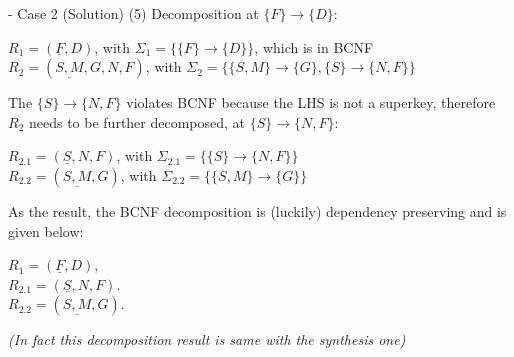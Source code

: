 \begin{frame}[fragile]{ - Case 2 (Solution)}
	(5) Decomposition at $\{F\} \rightarrow \{D\}$:\\\vspace{5pt}
	
	$R_1 = (\underline{F}, D)$, with $\Sigma_1 =\{\{F\} \rightarrow \{D\}\}$, which is in BCNF\\
	$R_2 = (\underline{S,M}, G, N, F)$, with $\Sigma_2 =\{\{S,M\} \rightarrow \{G\}, \{S\} \rightarrow \{N,F\}\}$\\\vspace{5pt}
	
	The $\{S\} \rightarrow \{N,F\}$ violates BCNF because the LHS is not a superkey, therefore $R_2$ needs to be further decomposed, at $\{S\} \rightarrow \{N,F\}$:\\\vspace{5pt}
	
	$R_{2.1} = (\underline{S}, N, F)$, with $\Sigma_{2.1} =\{\{S\} \rightarrow \{N,F\}\}$\\
	$R_{2.2} = (\underline{S,M}, G)$, with $\Sigma_{2.2} =\{\{S,M\} \rightarrow \{G\}\}$\\\vspace{5pt}
	
	As the result, the BCNF decomposition is (luckily) dependency preserving and is given below:\\\vspace{5pt}
	
	$R_1 = (\underline{F}, D),$\\
	$R_{2.1} = (\underline{S}, N, F).$\\
	$R_{2.2} = (\underline{S,M}, G).$\\\vspace{5pt}
	
	\textit{(In fact this decomposition result is same with the synthesis one)}
\end{frame}

